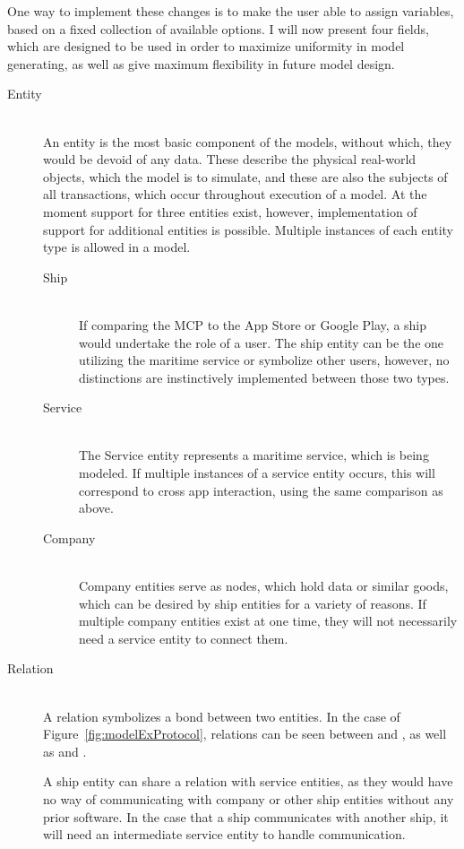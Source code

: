 One way to implement these changes is to make the user able to assign variables, based on a fixed collection of available options. I will now present four fields, which are designed to be used in order to maximize uniformity in model generating, as well as give maximum flexibility in future model design.
\begin{description}
  \item[Entity]\ \\
  An entity is the most basic component of the models, without which, they would be devoid of any data. These describe the physical real-world objects, which the model is to simulate, and these are also the subjects of all transactions, which occur throughout execution of a model. At the moment support for three entities exist, however, implementation of support for additional entities is possible.
  Multiple instances of each entity type is allowed in a model.\newpage
  \begin{description}
    \item[Ship]\ \\
      If comparing the MCP to the App Store or Google Play, a ship would undertake the role of a user. The ship entity can be the one utilizing the maritime service or symbolize other users, however, no distinctions are instinctively implemented between those two types.
    \item[Service]\ \\
      The Service entity represents a maritime service, which is being modeled. If multiple instances of a service entity occurs, this will correspond to cross app interaction, using the same comparison as above.
    \item[Company]\ \\
      Company entities serve as nodes, which hold data or similar goods, which can be desired by ship entities for a variety of reasons. If multiple company entities exist at one time, they will not necessarily need a service entity to connect them. 
  \end{description}
  \item[Relation]\ \\
    A relation symbolizes a bond between two entities. In the case of Figure~\ref{fig:modelExProtocol}, relations can be seen between  and , as well as  and .

    A ship entity can share a relation with service entities, as they would have no way of communicating with company or other ship entities without any prior software. In the case that a ship communicates with another ship, it will need an intermediate service entity to handle communication.


\end{description}
